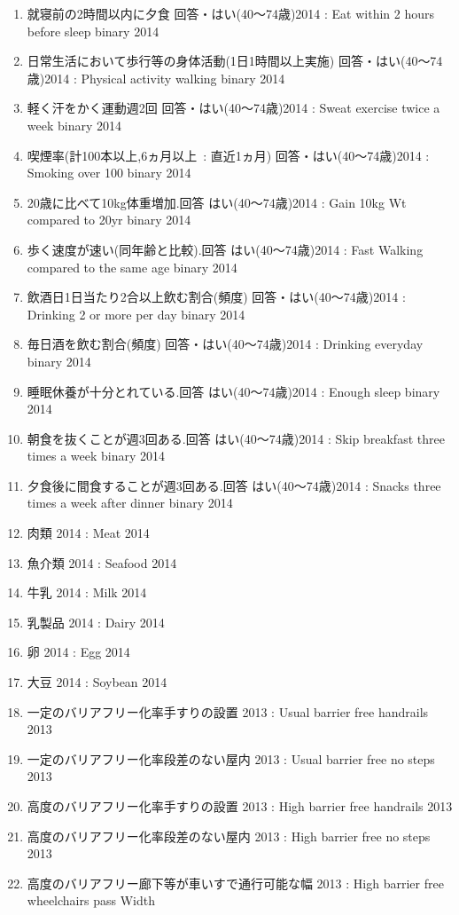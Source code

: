 \begin{multicols}{2}
\begin{enumerate}
  \item 就寝前の2時間以内に夕食 回答・はい(40〜74歳)2014  :  Eat within 2 hours before sleep binary 2014
  \item 日常生活において歩行等の身体活動(1日1時間以上実施) 回答・はい(40〜74歳)2014  :  Physical activity walking binary 2014
  \item 軽く汗をかく運動週2回 回答・はい(40〜74歳)2014  :  Sweat exercise twice a week binary 2014
  \item 喫煙率(計100本以上,6ヵ月以上\ : 直近1ヵ月) 回答・はい(40〜74歳)2014  :  Smoking over 100 binary 2014
  \item 20歳に比べて10kg体重増加.回答 はい(40〜74歳)2014  :  Gain 10kg Wt compared to 20yr binary 2014
  \item 歩く速度が速い(同年齢と比較).回答 はい(40〜74歳)2014  :  Fast Walking compared to the same age binary 2014
  \item 飲酒日1日当たり2合以上飲む割合(頻度) 回答・はい(40〜74歳)2014  :  Drinking 2 or more per day binary 2014
  \item 毎日酒を飲む割合(頻度) 回答・はい(40〜74歳)2014  :  Drinking everyday binary 2014
  \item 睡眠休養が十分とれている.回答 はい(40〜74歳)2014  :  Enough sleep binary 2014
  \item 朝食を抜くことが週3回ある.回答 はい(40〜74歳)2014  :  Skip breakfast three times a week binary 2014
  \item 夕食後に間食することが週3回ある.回答 はい(40〜74歳)2014  :  Snacks three times a week after dinner binary 2014
  \item 肉類 2014  :  Meat 2014
  \item 魚介類 2014  :  Seafood 2014
  \item 牛乳 2014  :  Milk 2014
  \item 乳製品 2014  :  Dairy 2014
  \item 卵 2014  :  Egg 2014
  \item 大豆 2014  :  Soybean 2014
  \item 一定のバリアフリー化率手すりの設置 2013  :  Usual barrier free handrails 2013
  \item 一定のバリアフリー化率段差のない屋内 2013  :  Usual barrier free no steps 2013
  \item 高度のバリアフリー化率手すりの設置 2013  :  High barrier free handrails 2013
  \item 高度のバリアフリー化率段差のない屋内 2013  :  High barrier free no steps 2013
  \item 高度のバリアフリー廊下等が車いすで通行可能な幅 2013  :  High barrier free wheelchairs pass Width

\end{enumerate}
\end{multicols}
